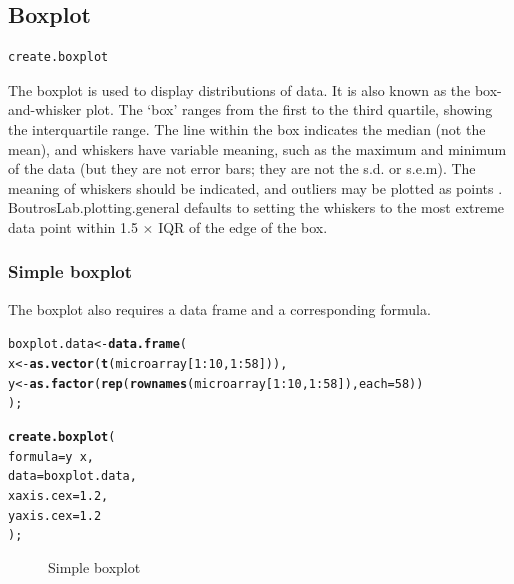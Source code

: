 \documentclass[letterpaper]{report}\usepackage[]{graphicx}\usepackage[]{color}
\makeatletter
\newcommand{\hlnum}[1]{\textcolor[rgb]{0.686,0.059,0.569}{#1}}%
\newcommand{\hlopt}[1]{\textcolor[rgb]{0,0,0}{#1}}%
\newcommand{\hlstd}[1]{\textcolor[rgb]{0.345,0.345,0.345}{#1}}%
\newcommand{\hlkwb}[1]{\textcolor[rgb]{0.69,0.353,0.396}{#1}}%
\newcommand{\hlkwc}[1]{\textcolor[rgb]{0.333,0.667,0.333}{#1}}%
\newcommand{\hlkwd}[1]{\textcolor[rgb]{0.737,0.353,0.396}{\textbf{#1}}}%
\newenvironment{kframe}{%
 \def\at@end@of@kframe{}%
 \ifinner\ifhmode%
  \def\at@end@of@kframe{\end{minipage}}%
  \begin{minipage}{\columnwidth}%
 \fi\fi%
 \def\FrameCommand##1{\hskip\@totalleftmargin \hskip-\fboxsep
 \colorbox{shadecolor}{##1}\hskip-\fboxsep
     \hskip-\linewidth \hskip-\@totalleftmargin \hskip\columnwidth}%
 \MakeFramed {\advance\hsize-\width
   \@totalleftmargin\z@ \linewidth\hsize
   \@setminipage}}%
 {\par\unskip\endMakeFramed%
 \at@end@of@kframe}
\newenvironment{knitrout}{}{} %
\makeatother
\begin{document}
\subsection{Boxplot}
\begin{verbatim}
create.boxplot
\end{verbatim}

The boxplot is used to display distributions of data. It is also known as the box-and-whisker plot. The `box' ranges from the first to the third quartile, showing the interquartile range. The line within the box indicates the median (not the mean), and whiskers have variable meaning, such as the maximum and minimum of the data (but they are not error bars; they are not the s.d. or s.e.m). The meaning of whiskers should be indicated, and outliers may be plotted as points \cite{Krzywinski}. BoutrosLab.plotting.general defaults to setting the whiskers to the most extreme data point within 1.5 $\times$ IQR of the edge of the box.

\subsubsection{Simple boxplot}
The boxplot also requires a data frame and a corresponding formula.
\begin{knitrout}
\color{fgcolor}\begin{kframe}
\begin{alltt}
\hlstd{boxplot.data} \hlkwb{<-} \hlkwd{data.frame}\hlstd{(}
    \hlstd{x} \hlkwb{<-} \hlkwd{as.vector}\hlstd{(}\hlkwd{t}\hlstd{(microarray[}\hlnum{1}\hlopt{:}\hlnum{10}\hlstd{,}\hlnum{1}\hlopt{:}\hlnum{58}\hlstd{])),}
    \hlstd{y} \hlkwb{<-} \hlkwd{as.factor}\hlstd{(}\hlkwd{rep}\hlstd{(}\hlkwd{rownames}\hlstd{(microarray[}\hlnum{1}\hlopt{:}\hlnum{10}\hlstd{,}\hlnum{1}\hlopt{:}\hlnum{58}\hlstd{]),} \hlkwc{each} \hlstd{=} \hlnum{58}\hlstd{))}
    \hlstd{);}

\hlkwd{create.boxplot}\hlstd{(}
    \hlkwc{formula} \hlstd{= y} \hlopt{~} \hlstd{x,}
    \hlkwc{data} \hlstd{= boxplot.data,}
    \hlkwc{xaxis.cex} \hlstd{=} \hlnum{1.2}\hlstd{,}
    \hlkwc{yaxis.cex} \hlstd{=} \hlnum{1.2}
    \hlstd{);}
\end{alltt}
\end{kframe}\begin{figure}

{\centering {} 

}

\caption[Simple boxplot]{Simple boxplot}\label{fig:boxplot1}
\end{figure}


\end{knitrout}
\end{document}

